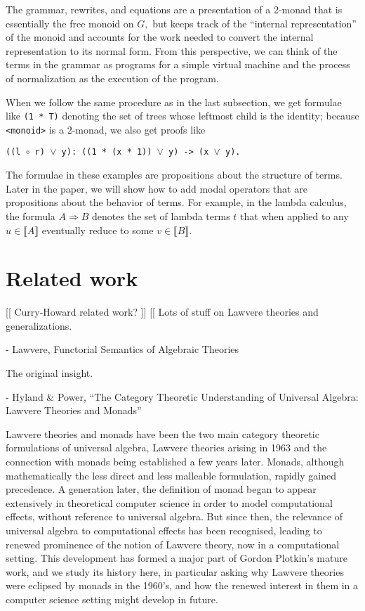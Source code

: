 \documentclass{article}
\newcommand{\interp}[1]{\llbracket #1 \rrbracket}
\begin{document}
The grammar, rewrites, and equations are a presentation of a 2-monad that is essentially the free monoid on $G,$ but keeps track of the ``internal representation'' of the monoid and accounts for the work needed to convert the internal representation to its normal form.  From this perspective, we can think of the terms in the grammar as programs for a simple virtual machine and the process of normalization as the execution of the program.

When we follow the same procedure as in the last subsection, we get formulae like {\tt (1 * T)} denoting the set of trees whose leftmost child is the identity; because {\tt <monoid>} is a 2-monad, we also get proofs like 
\begin{center}
  \tt ((l $\circ$ r) $\lor$ y): ((1 * (x * 1)) $\lor$ y) -> (x $\lor$ y).
\end{center}

The formulae in these examples are propositions about the structure of terms.  Later in the paper, we will show how to add modal operators that are propositions about the behavior of terms.  For example, in the lambda calculus, the formula ${A \Rightarrow B}$ denotes the set of lambda terms $t$ that when applied to any $u \in \interp{A}$ eventually reduce to some $v \in \interp{B}.$

\section{Related work}
[[ Curry-Howard related work? ]]
[[ Lots of stuff on Lawvere theories and generalizations.  

- Lawvere, Functorial Semantics of Algebraic Theories

The original insight.

- Hyland \& Power, ``The Category Theoretic Understanding of Universal Algebra: Lawvere Theories and Monads''

  Lawvere theories and monads have been the two main category theoretic formulations of universal algebra, Lawvere theories arising in 1963 and the connection with monads being established a few years later. Monads, although mathematically the less direct and less malleable formulation, rapidly gained precedence. A generation later, the definition of monad began to appear extensively in theoretical computer science in order to model computational effects, without reference to universal algebra. But since then, the relevance of universal algebra to computational effects has been recognised, leading to renewed prominence of the notion of Lawvere theory, now in a computational setting. This development has formed a major part of Gordon Plotkin’s mature work, and we study its history here, in particular asking why Lawvere theories were eclipsed by monads in the 1960’s, and how the renewed interest in them in a computer science setting might develop in future.
\end{document}
